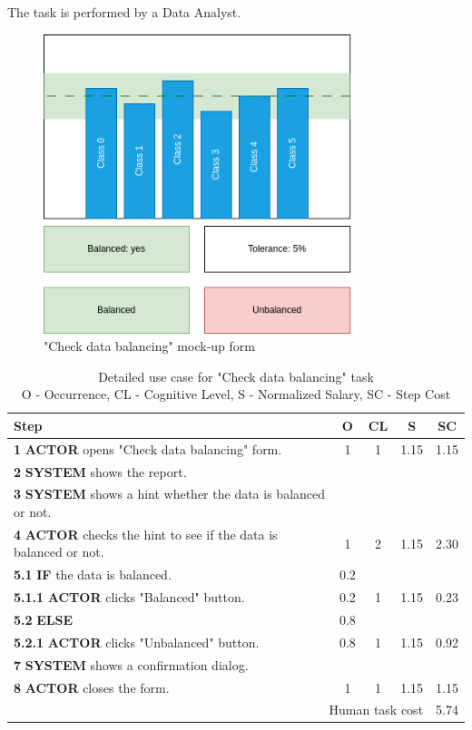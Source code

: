 The task is performed by a Data Analyst.

\begin{figure}[H]
\centering
\includegraphics[width=0.8\textwidth]{figures/check_data_balancing.png}
\caption{"Check data balancing" mock-up form}
\end{figure}

\begin{table}[H]
\centering
\begin{tabularx}{\textwidth}{|X|c|c|c|c|}
\hline
\textbf{Step} & \textbf{O} & \textbf{CL} & \textbf{S} & \textbf{SC} \\
\hline
\textbf{1} \textbf{ACTOR} opens "Check data balancing" form. & 1 & 1 & 1.15 & 1.15 \\
\hline
\textbf{2} \textbf{SYSTEM} shows the report. & & & & \\
\hline
\textbf{3} \textbf{SYSTEM} shows a hint whether the data is balanced or not. & & & & \\
\hline
\textbf{4} \textbf{ACTOR} checks the hint to see if the data is balanced or not. & 1 & 2 & 1.15 & 2.30 \\
\hline
\textbf{5.1} \textbf{IF} the data is balanced. & 0.2 & & & \\
\hline
\textbf{5.1.1} \textbf{ACTOR} clicks "Balanced" button. & 0.2 & 1 & 1.15 & 0.23 \\
\hline
\textbf{5.2} \textbf{ELSE} & 0.8 & & & \\
\hline
\textbf{5.2.1} \textbf{ACTOR} clicks "Unbalanced" button. & 0.8 & 1 & 1.15 & 0.92 \\
\hline
\textbf{7} \textbf{SYSTEM} shows a confirmation dialog. & & & & \\
\hline
\textbf{8} \textbf{ACTOR} closes the form. & 1 & 1 & 1.15 & 1.15 \\
\hline
\multicolumn{4}{|r|}{Human task cost} & 5.74 \\
\hline
\end{tabularx}
\caption{Detailed use case for "Check data balancing" task\\ 
 O - Occurrence, CL - Cognitive Level, S - Normalized Salary, SC - Step Cost}
\label{table:check_data_balancing}
\end{table}


